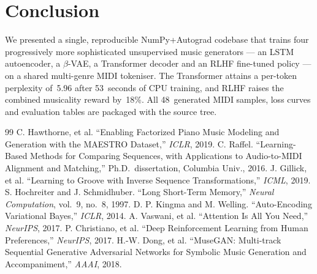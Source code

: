 \documentclass[conference]{IEEEtran}
\begin{document}
\section{Conclusion}

We presented a single, reproducible NumPy+Autograd codebase that trains
four progressively more sophisticated unsupervised music generators --- an
LSTM autoencoder, a $\beta$-VAE, a Transformer decoder and an RLHF
fine-tuned policy --- on a shared multi-genre MIDI tokeniser. The
Transformer attains a per-token perplexity of~5.96 after 53~seconds of
CPU training, and RLHF raises the combined musicality reward by~18\%.
All 48~generated MIDI samples, loss curves and evaluation tables are
packaged with the source tree.

\begin{thebibliography}{99}
 C. Hawthorne, et al. ``Enabling Factorized Piano Music Modeling and Generation with the MAESTRO Dataset,'' \emph{ICLR}, 2019.
 C. Raffel. ``Learning-Based Methods for Comparing Sequences, with Applications to Audio-to-MIDI Alignment and Matching,'' Ph.D.\ dissertation, Columbia Univ., 2016.
 J. Gillick, et al. ``Learning to Groove with Inverse Sequence Transformations,'' \emph{ICML}, 2019.
 S. Hochreiter and J. Schmidhuber. ``Long Short-Term Memory,'' \emph{Neural Computation}, vol.~9, no.~8, 1997.
 D. P. Kingma and M. Welling. ``Auto-Encoding Variational Bayes,'' \emph{ICLR}, 2014.
 A. Vaswani, et al. ``Attention Is All You Need,'' \emph{NeurIPS}, 2017.
 P. Christiano, et al. ``Deep Reinforcement Learning from Human Preferences,'' \emph{NeurIPS}, 2017.
 H.-W. Dong, et al. ``MuseGAN: Multi-track Sequential Generative Adversarial Networks for Symbolic Music Generation and Accompaniment,'' \emph{AAAI}, 2018.
\end{thebibliography}
\end{document}
